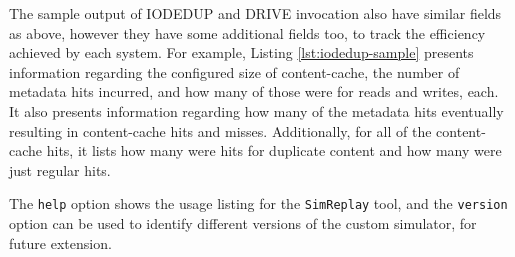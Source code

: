 The sample output of IODEDUP and DRIVE invocation also have similar fields
as above, however they have some additional fields too, to track the
efficiency achieved by each system. For example, Listing \ref{lst:iodedup-sample}
presents information regarding the configured size of content-cache,
the number of metadata hits incurred, and how many of those were for
reads and writes, each. It also presents information regarding how many
of the metadata hits eventually resulting in content-cache hits and misses.
Additionally, for all of the content-cache hits, it lists how many were hits for
duplicate content and how many were just regular hits.

The \texttt{help} option shows the usage listing 
for the \texttt{SimReplay} tool, and the
\texttt{version} option can be used to identify different versions of
the custom simulator, for future extension.

